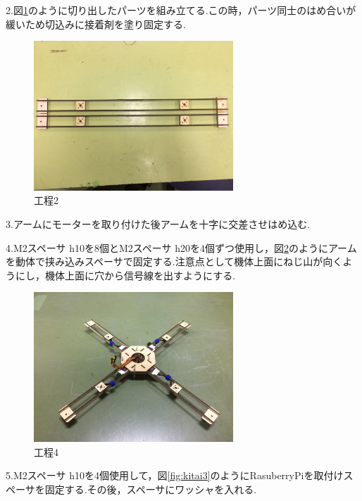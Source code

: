 \documentclass[12pt,oneside]{sotsuken_paper}
\begin{document}
2.図\ref{fig:kitai1}のように切り出したパーツを組み立てる.この時，パーツ同士のはめ合いが緩いため切込みに接着剤を塗り固定する.

\begin{figure}[htbp]
	\begin{center}
		\includegraphics[width=75mm]{image/kitai/kitai1.jpg}
		\caption{工程2}
		\label{fig:kitai1}
	\end{center}
\end{figure}


3.アームにモーターを取り付けた後アームを十字に交差させはめ込む.


4.M2スペーサ h10を8個とM2スペーサ h20を4個ずつ使用し，図\ref{fig:kitai2}のようにアームを動体で挟み込みスペーサで固定する.注意点として機体上面にねじ山が向くようにし，機体上面に穴から信号線を出すようにする.

\begin{figure}[htbp]
	\begin{center}
		\includegraphics[width=75mm]{image/kitai/kitai2.jpg}
		\caption{工程4}
		\label{fig:kitai2}
	\end{center}
\end{figure}


5.M2スペーサ h10を4個使用して，図\ref{fig:kitai3}のようにRasuberryPiを取付けスペーサを固定する.その後，スペーサにワッシャを入れる.
\end{document}
